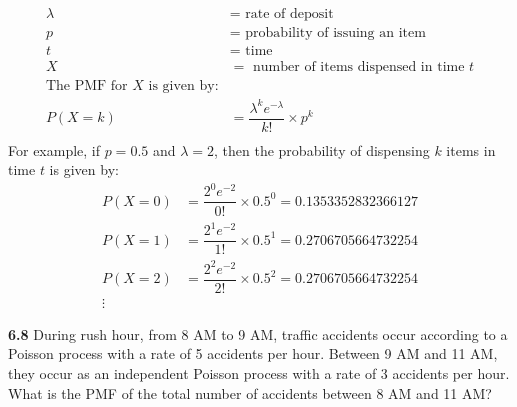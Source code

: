 \documentclass[answers]{exam}
\begin{document}
\begin{questions}
    \begin{solution}
        \begin{align*}
            \lambda  & = \text{ rate of deposit}                       \\
            p        & = \text{ probability of issuing an item}        \\
            t        & = \text{ time}                                  \\
            X        & = \text{ number of items dispensed in time } t  \\
            \text{The PMF for } X \text{ is given by:}                 \\
            P(X = k) & = \dfrac{\lambda^k e^{-\lambda}}{k!} \times p^k \\
        \end{align*}
        For example, if $p = 0.5$ and $\lambda = 2$, then the probability of dispensing $k$ items in time $t$ is given by:
        \begin{align*}
            P(X = 0) & = \dfrac{2^0 e^{-2}}{0!} \times 0.5^0 = 0.1353352832366127 \\
            P(X = 1) & = \dfrac{2^1 e^{-2}}{1!} \times 0.5^1 = 0.2706705664732254 \\
            P(X = 2) & = \dfrac{2^2 e^{-2}}{2!} \times 0.5^2 = 0.2706705664732254 \\
            \vdots
        \end{align*}
    \end{solution}

    \question \textbf{6.8} During rush hour, from 8 AM to 9 AM, traffic accidents occur according to a Poisson process
    with a rate of 5 accidents per hour. Between 9 AM and 11 AM, they occur as an independent
    Poisson process with a rate of 3 accidents per hour. What is the PMF of the total number
    of accidents between 8 AM and 11 AM?


\end{questions}
\end{document}
